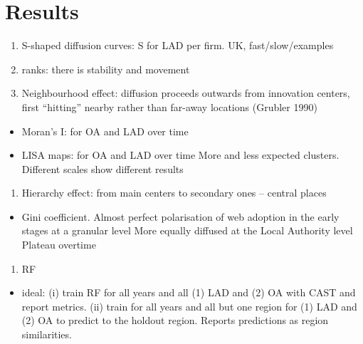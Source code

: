 \documentclass[
  authoryear,
  preprint,
  3p]{elsarticle}
\providecommand{\tightlist}{%
  \setlength{\itemsep}{0pt}\setlength{\parskip}{0pt}}\usepackage{longtable,booktabs,array}
\begin{document}
\section{Results}\label{sec-results}

\begin{enumerate}
\def\labelenumi{\arabic{enumi}.}
\item
  S-shaped diffusion curves: S for LAD per firm. UK, fast/slow/examples
\item
  ranks: there is stability and movement
\item
  Neighbourhood effect: diffusion proceeds outwards from innovation
  centers, first ``hitting'' nearby rather than far-away locations
  (Grubler 1990)
\end{enumerate}

\begin{itemize}
\item
  Moran's I: for OA and LAD over time
\item
  LISA maps: for OA and LAD over time More and less expected clusters.
  Different scales show different results
\end{itemize}

\begin{enumerate}
\def\labelenumi{\arabic{enumi}.}
\setcounter{enumi}{3}
\tightlist
\item
  Hierarchy effect: from main centers to secondary ones -- central
  places
\end{enumerate}

\begin{itemize}
\tightlist
\item
  Gini coefficient. Almost perfect polarisation of web adoption in the
  early stages at a granular level More equally diffused at the Local
  Authority level Plateau overtime
\end{itemize}

\begin{enumerate}
\def\labelenumi{\arabic{enumi}.}
\setcounter{enumi}{4}
\tightlist
\item
  RF
\end{enumerate}

\begin{itemize}
\tightlist
\item
  ideal: (i) train RF for all years and all (1) LAD and (2) OA with CAST
  and report metrics. (ii) train for all years and all but one region
  for (1) LAD and (2) OA to predict to the holdout region. Reports
  predictions as region similarities.
\end{itemize}
\end{document}
